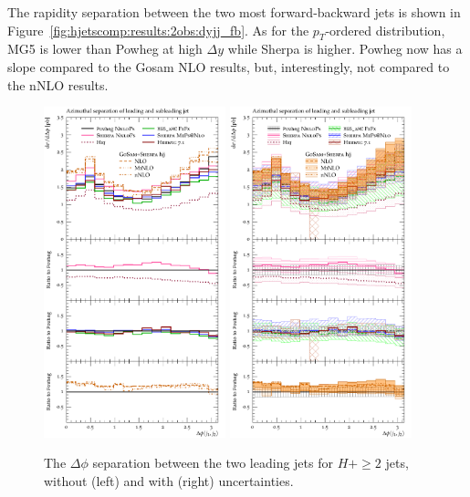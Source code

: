 The rapidity separation between the two most forward-backward jets is
shown in Figure~\ref{fig:hjetscomp:results:2obs:dyjj_fb}. As for the
$p_T$-ordered distribution, MG5 is lower than Powheg at high $\Delta
y$ while Sherpa is higher. Powheg now has a slope compared to the
Gosam NLO results, but, interestingly, not compared to the nNLO
results.

\begin{figure}[t!]
  \centering
  \includegraphics[width=0.47\textwidth]{figures/hjetscomp_u_deltaphi_jj_incl.pdf}
  \hfill
  \includegraphics[width=0.47\textwidth]{figures/hjetscomp_deltaphi_jj_incl.pdf}
  \caption{
    The $\Delta\phi$ separation between the two leading jets for
    $H+\ge2$ jets, without (left) and with (right) uncertainties. 
    \label{fig:hjetscomp:results:2obs:dphi_jj}
  }
\end{figure}

